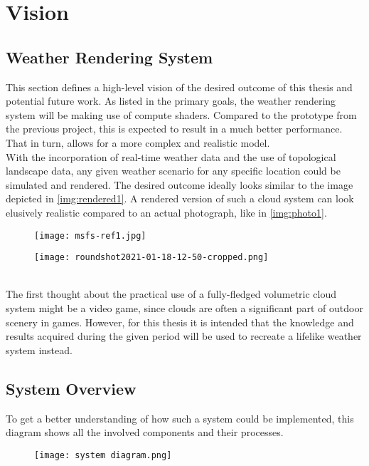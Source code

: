 \section{Vision}

\subsection{Weather Rendering System}
This section defines a high-level vision of the desired outcome of this thesis and potential future work.
As listed in the primary goals, the weather rendering system will be making use of compute shaders.
Compared to the prototype from the previous project, this is expected to result in a much better performance.
That in turn, allows for a more complex and realistic model.
\\
With the incorporation of real-time weather data and the use of topological landscape data, any given weather scenario for any specific location could be simulated and rendered.
The desired outcome ideally looks similar to the image depicted in \autoref{img:rendered1}.
A rendered version of such a cloud system can look elusively realistic compared to an actual photograph, like in \autoref{img:photo1}.
\begin{figure}[ht]
    \centering
        \begin{minipage}{0.47\linewidth}
            \texttt{[image: msfs-ref1.jpg]}
            \label{img:rendered1}
        \end{minipage}
    \hfill
        \begin{minipage}{0.47\linewidth}
            \texttt{[image: roundshot2021-01-18-12-50-cropped.png]}
            \label{img:photo1}        
        \end{minipage}  
\end{figure}
\\
The first thought about the practical use of a fully-fledged volumetric cloud system might be a video game, since clouds are often a significant part of outdoor scenery in games.
However, for this thesis it is intended that the knowledge and results acquired during the given period will be used to recreate a lifelike weather system instead.

\clearpage

\subsection{System Overview}
To get a better understanding of how such a system could be implemented, this diagram shows all the involved components and their processes.
\begin{figure}[H]
    \centering
    \texttt{[image: system diagram.png]}
    \label{img:systemoverview}
\end{figure}

